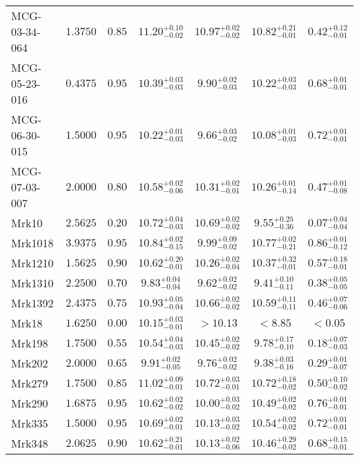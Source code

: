 \documentclass[onecolumn]{mn2e}
\begin{document}
{\begin{center}
\begin{longtable}{lcccccc}
MCG-03-34-064 & $1.3750$ & $0.85$ & $11.20_{-0.02}^{+0.10}$ & $10.97_{-0.02}^{+0.02}$ & $10.82_{-0.01}^{+0.21}$ &$0.42_{-0.01}^{+0.12}$ \\
MCG-05-23-016 & $0.4375$ & $0.95$ & $10.39_{-0.03}^{+0.03}$ & $9.90_{-0.03}^{+0.02}$ & $10.22_{-0.03}^{+0.03}$ &$0.68_{-0.01}^{+0.01}$ \\
MCG-06-30-015 & $1.5000$ & $0.95$ & $10.22_{-0.03}^{+0.01}$ & $9.66_{-0.02}^{+0.03}$ & $10.08_{-0.03}^{+0.01}$ &$0.72_{-0.01}^{+0.01}$ \\
MCG-07-03-007 & $2.0000$ & $0.80$ & $10.58_{-0.06}^{+0.02}$ & $10.31_{-0.01}^{+0.02}$ & $10.26_{-0.14}^{+0.01}$ &$0.47_{-0.08}^{+0.01}$ \\
Mrk10 & $2.5625$ & $0.20$ & $10.72_{-0.03}^{+0.04}$ & $10.69_{-0.02}^{+0.02}$ & $9.55_{-0.36}^{+0.25}$ &$0.07_{-0.04}^{+0.04}$ \\
Mrk1018 & $3.9375$ & $0.95$ & $10.84_{-0.15}^{+0.02}$ & $9.99_{-0.02}^{+0.09}$ & $10.77_{-0.21}^{+0.02}$ &$0.86_{-0.12}^{+0.01}$ \\
Mrk1210 & $1.5625$ & $0.90$ & $10.62_{-0.01}^{+0.20}$ & $10.26_{-0.04}^{+0.02}$ & $10.37_{-0.01}^{+0.32}$ &$0.57_{-0.01}^{+0.18}$ \\
Mrk1310 & $2.2500$ & $0.70$ & $9.83_{-0.04}^{+0.04}$ & $9.62_{-0.02}^{+0.02}$ & $9.41_{-0.11}^{+0.10}$ &$0.38_{-0.05}^{+0.05}$ \\
Mrk1392 & $2.4375$ & $0.75$ & $10.93_{-0.04}^{+0.05}$ & $10.66_{-0.02}^{+0.02}$ & $10.59_{-0.11}^{+0.11}$ &$0.46_{-0.06}^{+0.07}$ \\
Mrk18 & $1.6250$ & $0.00$ & $10.15_{-0.01}^{+0.03}$ & $>10.13$ & $<8.85$ &$<0.05$ \\
Mrk198 & $1.7500$ & $0.55$ & $10.54_{-0.03}^{+0.04}$ & $10.45_{-0.02}^{+0.02}$ & $9.78_{-0.10}^{+0.17}$ &$0.18_{-0.03}^{+0.07}$ \\
Mrk202 & $2.0000$ & $0.65$ & $9.91_{-0.05}^{+0.02}$ & $9.76_{-0.02}^{+0.02}$ & $9.38_{-0.16}^{+0.03}$ &$0.29_{-0.07}^{+0.01}$ \\
Mrk279 & $1.7500$ & $0.85$ & $11.02_{-0.01}^{+0.09}$ & $10.72_{-0.01}^{+0.03}$ & $10.72_{-0.02}^{+0.18}$ &$0.50_{-0.02}^{+0.10}$ \\
Mrk290 & $1.6875$ & $0.95$ & $10.62_{-0.02}^{+0.02}$ & $10.00_{-0.02}^{+0.03}$ & $10.49_{-0.02}^{+0.02}$ &$0.76_{-0.01}^{+0.01}$ \\
Mrk335 & $1.5000$ & $0.95$ & $10.69_{-0.01}^{+0.02}$ & $10.13_{-0.02}^{+0.03}$ & $10.54_{-0.02}^{+0.02}$ &$0.72_{-0.01}^{+0.01}$ \\
Mrk348 & $2.0625$ & $0.90$ & $10.62_{-0.01}^{+0.21}$ & $10.13_{-0.06}^{+0.02}$ & $10.46_{-0.02}^{+0.29}$ &$0.68_{-0.01}^{+0.15}$ \\

\end{longtable}
\end{center}}
\end{document}
